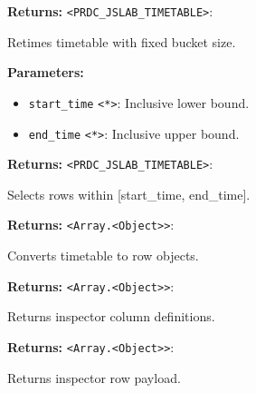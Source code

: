 \documentclass[12pt,a4paper]{article}
\begin{document}
\noindent \textbf{Returns:} \texttt{<PRDC\_JSLAB\_TIMETABLE>}:

\noindent Retimes timetable with fixed bucket size.

\vspace{5mm}
\noindent {}


\noindent \textbf{Parameters:}
\begin{itemize}
  \item \texttt{start\_time} \texttt{<*>}: Inclusive lower bound.
  \item \texttt{end\_time} \texttt{<*>}: Inclusive upper bound.
\end{itemize}

\noindent \textbf{Returns:} \texttt{<PRDC\_JSLAB\_TIMETABLE>}:

\noindent Selects rows within [start\_time, end\_time].

\vspace{5mm}
\noindent {}


\noindent \textbf{Returns:} \texttt{<Array.<Object>>}:

\noindent Converts timetable to row objects.

\vspace{5mm}
\noindent {}


\noindent \textbf{Returns:} \texttt{<Array.<Object>>}:

\noindent Returns inspector column definitions.

\vspace{5mm}
\noindent {}


\noindent \textbf{Returns:} \texttt{<Array.<Object>>}:

\noindent Returns inspector row payload.

\vspace{5mm}
\noindent {}
\end{document}
